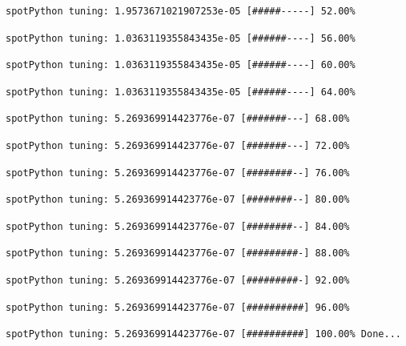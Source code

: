 \documentclass[
  letterpaper,
  DIV=11,
  numbers=noendperiod]{scrreprt}
\begin{document}
\begin{verbatim}
spotPython tuning: 1.9573671021907253e-05 [#####-----] 52.00% 
\end{verbatim}

\begin{verbatim}
spotPython tuning: 1.0363119355843435e-05 [######----] 56.00% 
\end{verbatim}

\begin{verbatim}
spotPython tuning: 1.0363119355843435e-05 [######----] 60.00% 
\end{verbatim}

\begin{verbatim}
spotPython tuning: 1.0363119355843435e-05 [######----] 64.00% 
\end{verbatim}

\begin{verbatim}
spotPython tuning: 5.269369914423776e-07 [#######---] 68.00% 
\end{verbatim}

\begin{verbatim}
spotPython tuning: 5.269369914423776e-07 [#######---] 72.00% 
\end{verbatim}

\begin{verbatim}
spotPython tuning: 5.269369914423776e-07 [########--] 76.00% 
\end{verbatim}

\begin{verbatim}
spotPython tuning: 5.269369914423776e-07 [########--] 80.00% 
\end{verbatim}

\begin{verbatim}
spotPython tuning: 5.269369914423776e-07 [########--] 84.00% 
\end{verbatim}

\begin{verbatim}
spotPython tuning: 5.269369914423776e-07 [#########-] 88.00% 
\end{verbatim}

\begin{verbatim}
spotPython tuning: 5.269369914423776e-07 [#########-] 92.00% 
\end{verbatim}

\begin{verbatim}
spotPython tuning: 5.269369914423776e-07 [##########] 96.00% 
\end{verbatim}

\begin{verbatim}
spotPython tuning: 5.269369914423776e-07 [##########] 100.00% Done...
\end{verbatim}
\end{document}
